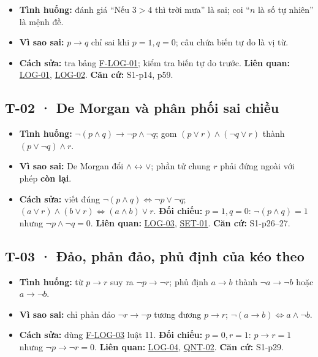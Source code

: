 \documentclass[
  10pt,
  twoside,openany]{book}
\providecommand{\tightlist}{%
  \setlength{\itemsep}{0pt}\setlength{\parskip}{0pt}}
\begin{document}
\begin{itemize}
\tightlist
\item
  \textbf{Tình huống:} đánh giá ``Nếu \(3>4\) thì trời mưa'' là sai; coi
  ``\(n\) là số tự nhiên'' là mệnh đề.
\item
  \textbf{Vì sao sai:} \(p\to q\) chỉ sai khi \(p=1,q=0\); câu chứa biến
  tự do là vị từ.
\item
  \textbf{Cách sửa:} tra bảng \protect\hyperlink{F-LOG-01}{F-LOG-01};
  kiểm tra biến tự do trước. \textbf{Liên quan:}
  \protect\hyperlink{LOG-01}{LOG-01},
  \protect\hyperlink{LOG-02}{LOG-02}. \textbf{Căn cứ:} S1-p14, p59.
\end{itemize}

\hypertarget{T-02}{%
\subsection{T-02 · De Morgan và phân phối sai chiều}\label{T-02}}

\begin{itemize}
\tightlist
\item
  \textbf{Tình huống:} \(\neg(p\wedge q)\to\neg p\wedge\neg q\); gom
  \((p\vee r)\wedge(\neg q\vee r)\) thành \((p\vee\neg q)\wedge r\).
\item
  \textbf{Vì sao sai:} De Morgan đổi \(\wedge\leftrightarrow\vee\); phần
  tử chung \(r\) phải đứng ngoài với phép \textbf{còn lại}.
\item
  \textbf{Cách sửa:} viết đúng
  \(\neg(p\wedge q)\Leftrightarrow\neg p\vee\neg q\);
  \((a\vee r)\wedge(b\vee r)\Leftrightarrow(a\wedge b)\vee r\).
  \textbf{Đối chiếu:} \(p=1,q=0\): \(\neg(p\wedge q)=1\) nhưng
  \(\neg p\wedge\neg q=0\). \textbf{Liên quan:}
  \protect\hyperlink{LOG-03}{LOG-03},
  \protect\hyperlink{SET-01}{SET-01}. \textbf{Căn cứ:} S1-p26--27.
\end{itemize}

\hypertarget{T-03}{%
\subsection{T-03 · Đảo, phản đảo, phủ định của kéo theo}\label{T-03}}

\begin{itemize}
\tightlist
\item
  \textbf{Tình huống:} từ \(p\to r\) suy ra \(\neg p\to\neg r\); phủ
  định \(a\to b\) thành \(\neg a\to\neg b\) hoặc \(a\to\neg b\).
\item
  \textbf{Vì sao sai:} chỉ phản đảo \(\neg r\to\neg p\) tương đương
  \(p\to r\); \(\neg(a\to b)\Leftrightarrow a\wedge\neg b\).
\item
  \textbf{Cách sửa:} dùng \protect\hyperlink{F-LOG-03}{F-LOG-03} luật
  11. \textbf{Đối chiếu:} \(p=0,r=1\): \(p\to r=1\) nhưng
  \(\neg p\to\neg r=0\). \textbf{Liên quan:}
  \protect\hyperlink{LOG-04}{LOG-04},
  \protect\hyperlink{QNT-02}{QNT-02}. \textbf{Căn cứ:} S1-p29.
\end{itemize}
\end{document}
